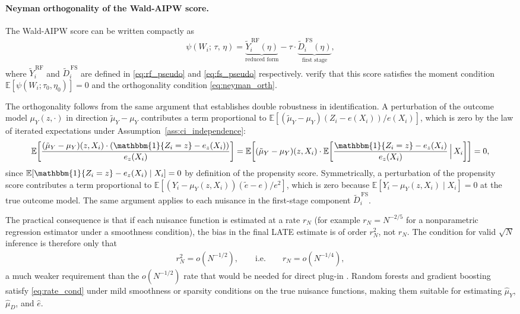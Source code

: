 \documentclass[12pt,a4paper]{article}
\newcommand{\E}{\mathbb{E}}
\newcommand{\ind}{\mathbbm{1}}
\begin{document}
\paragraph{Neyman orthogonality of the Wald-AIPW score.}
 
The Wald-AIPW score can be written compactly as
\begin{align}
    \psi(W_i;\, \tau,\, \eta)
    =
    \underbrace{
        \widetilde{Y}^{\,\mathrm{RF}}_i(\eta)
    }_{\text{reduced form}}
    -
    \tau \cdot
    \underbrace{
        \widetilde{D}^{\,\mathrm{FS}}_i(\eta)
    }_{\text{first stage}},
    \label{eq:wald_aipw_score}
\end{align}
where $\widetilde{Y}^{\,\mathrm{RF}}_i$ and $\widetilde{D}^{\,\mathrm{FS}}_i$ are
defined in \eqref{eq:rf_pseudo} and \eqref{eq:fs_pseudo} respectively.
\citet[Section~5.2, p.~C37]{chernozhukov2018double} verify that this score satisfies
the moment condition $\E[\psi(W_i;\tau_0,\eta_0)]=0$ and the orthogonality condition
\eqref{eq:neyman_orth}.
 
The orthogonality follows from the same argument that establishes double robustness in
identification. A perturbation of the outcome model $\mu_Y(z,\cdot)$ in direction
$\tilde\mu_Y - \mu_Y$ contributes a term proportional to
$\E[(\tilde\mu_Y - \mu_Y)(Z_i - e(X_i))/e(X_i)]$, which is zero by the law of iterated
expectations under Assumption~\ref{ass:ci_independence}:
\begin{align}
    \E\!\left[
        \frac{(\tilde\mu_Y - \mu_Y)(z, X_i)\cdot
        (\ind\{Z_i = z\} - e_z(X_i))}{e_z(X_i)}
    \right]
    =
    \E\!\left[
        (\tilde\mu_Y - \mu_Y)(z, X_i)\cdot
        \E\!\left[
            \frac{\ind\{Z_i = z\} - e_z(X_i)}{e_z(X_i)}
            \,\Big|\, X_i
        \right]
    \right]
    = 0,
    \label{eq:orth_mu}
\end{align}
since $\E[\ind\{Z_i = z\} - e_z(X_i) \mid X_i] = 0$ by definition of the propensity
score. Symmetrically, a perturbation of the propensity score contributes a term
proportional to $\E[(Y_i - \mu_Y(z,X_i))(\tilde e - e)/e^2]$, which is zero because
$\E[Y_i - \mu_Y(z,X_i) \mid X_i] = 0$ at the true outcome model. The same argument
applies to each nuisance in the first-stage component $\widetilde{D}^{\,\mathrm{FS}}_i$.
 
The practical consequence is that if each nuisance function is estimated at a rate $r_N$
(for example $r_N = N^{-2/5}$ for a nonparametric regression estimator under a smoothness
condition), the bias in the final LATE estimate is of order $r_N^2$, not $r_N$. The
condition for valid $\sqrt{N}$ inference is therefore only that
\begin{align}
    r_N^2 = o(N^{-1/2}),
    \qquad \text{i.e.} \qquad
    r_N = o(N^{-1/4}),
    \label{eq:rate_cond}
\end{align}
a much weaker requirement than the $o(N^{-1/2})$ rate that would be needed for direct
plug-in \citep[Assumption~3.2, p.~C25]{chernozhukov2018double}. Random forests and
gradient boosting satisfy \eqref{eq:rate_cond} under mild smoothness or sparsity
conditions on the true nuisance functions, making them suitable for estimating
$\hat\mu_Y$, $\hat\mu_D$, and $\hat e$.
 
\end{document}
